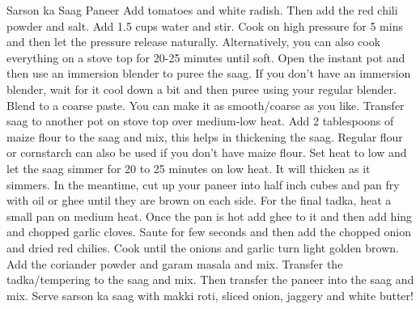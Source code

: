 \begin{recipe}[source=\url{https://www.cookwithmanali.com/sarson-ka-saag/},portion=\portion{4-6}]{Sarson ka Saag Paneer}
{\step Add tomatoes and white radish. Then add the red chili powder and salt. Add 1.5 cups water and stir.
\step Cook on high pressure for 5 mins and then let the pressure release naturally. Alternatively, you can also cook everything on a stove top for 20-25 minutes until soft.
\step Open the instant pot and then use an immersion blender to puree the saag. If you don't have an immersion blender, wait for it cool down a bit and then puree using your regular blender.
\step Blend to a coarse paste. You can make it as smooth/coarse as you like.
\step Transfer saag to another pot on stove top over medium-low heat. Add 2 tablespoons of maize flour to the saag and mix, this helps in thickening the saag. Regular flour or cornstarch can also be used if you don't have maize flour.
\step Set heat to low and let the saag simmer for 20 to 25 minutes on low heat. It will thicken as it simmers.
\step In the meantime, cut up your paneer into half inch cubes and pan fry with oil or ghee until they are brown on each side.
\step For the final tadka, heat a small pan on medium heat. Once the pan is hot add ghee to it and then add hing and chopped garlic cloves. Saute for few seconds and then add the chopped onion and dried red chilies.
\step Cook until the onions and garlic turn light golden brown. Add the coriander powder and garam masala and mix.
\step Transfer the tadka/tempering to the saag and mix. Then transfer the paneer into the saag and mix.
\step Serve sarson ka saag with makki roti, sliced onion, jaggery and white butter! 
}
\end{recipe}
